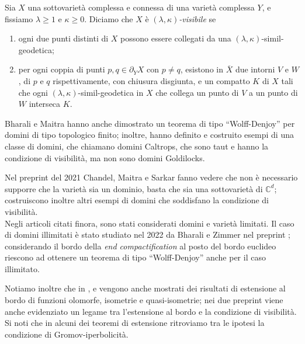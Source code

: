 \begin{defn}
    Sia $X$ una sottovarietà complessa e connessa di una varietà complessa $Y$, e fissiamo $\lambda \ge 1$ e $\kappa \ge 0$. Diciamo che $X$ è \textit{$(\lambda,\kappa)$-visibile} se
    \begin{enumerate}
        \item ogni due punti distinti di $X$ possono essere collegati da una $(\lambda,\kappa)$-simil-geodetica;
        \item per ogni coppia di punti $p,q\in\partial_YX$ con $p\not=q$, esistono in $\overline{X}$ due intorni $V$ e $W$, di $p$ e $q$ rispettivamente, con chiusura disgiunta, e un compatto $K$ di $X$ tali che  ogni $(\lambda,\kappa)$-simil-geodetica in $X$ che collega un punto di $V$ a un punto di $W$ interseca $K$.
    \end{enumerate}
\end{defn}

Bharali e Maitra hanno anche dimostrato un teorema di tipo ``Wolff-Denjoy'' per domini di tipo topologico finito; inoltre, hanno definito e costruito esempi di una classe di domini, che chiamano domini Caltrops, che sono taut e hanno la condizione di visibilità, ma non sono domini Goldilocks.

Nel preprint \cite{CMS} del 2021 Chandel, Maitra e Sarkar fanno vedere che non è necessario supporre che la varietà sia un dominio, basta che sia una sottovarietà di $\mathbb{C}^d$; costruiscono inoltre altri esempi di domini che soddisfano la condizione di visibilità.\\

Negli articoli citati finora, sono stati considerati domini e varietà limitati. Il caso di domini illimitati è stato studiato nel 2022 da Bharali e Zimmer nel preprint \cite{BZ2}; considerando il bordo della \textit{end compactification} al posto del bordo euclideo riescono ad ottenere un teorema di tipo ``Wolff-Denjoy'' anche per il caso illimitato.

Notiamo inoltre che in \cite{BZ1}, \cite{CMS} e \cite{BZ2} vengono anche mostrati dei risultati di estensione al bordo di funzioni olomorfe, isometrie e quasi-isometrie; nei due preprint viene anche evidenziato un legame tra l'estensione al bordo e la condizione di visibilità. Si noti che in alcuni dei teoremi di estensione ritroviamo tra le ipotesi la condizione di Gromov-iperbolicità. \\

